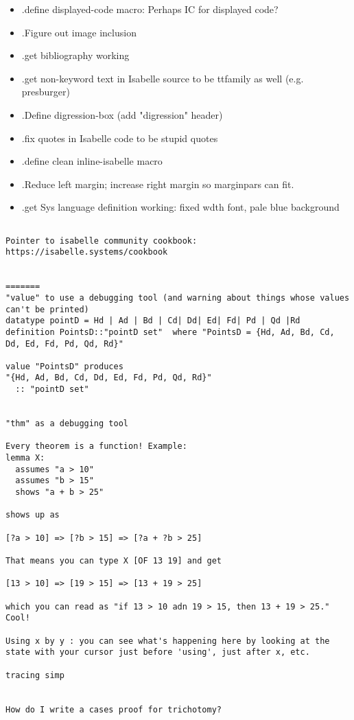 \begin{itemize}
\item .define displayed-code macro: Perhaps IC for displayed code? 
\item .Figure out image inclusion
\item .get bibliography working
\item .get non-keyword text in Isabelle source to be ttfamily as well (e.g. presburger)
\item .Define digression-box (add "digression" header)
\item .fix quotes in Isabelle code to be stupid quotes
\item .define clean inline-isabelle macro 
\item .Reduce left margin; increase right margin so marginpars can fit.
\item .get Sys language definition working: fixed wdth font, pale blue background
\end{itemize}

\begin{verbatim}

Pointer to isabelle community cookbook: https://isabelle.systems/cookbook


=======
"value" to use a debugging tool (and warning about things whose values can't be printed)
datatype pointD = Hd | Ad | Bd | Cd| Dd| Ed| Fd| Pd | Qd |Rd
definition PointsD::"pointD set"  where "PointsD = {Hd, Ad, Bd, Cd, Dd, Ed, Fd, Pd, Qd, Rd}"

value "PointsD" produces
"{Hd, Ad, Bd, Cd, Dd, Ed, Fd, Pd, Qd, Rd}"
  :: "pointD set"


"thm" as a debugging tool

Every theorem is a function! Example: 
lemma X: 
  assumes "a > 10"
  assumes "b > 15"
  shows "a + b > 25"
  
shows up as 

[?a > 10] => [?b > 15] => [?a + ?b > 25]

That means you can type X [OF 13 19] and get

[13 > 10] => [19 > 15] => [13 + 19 > 25]

which you can read as "if 13 > 10 adn 19 > 15, then 13 + 19 > 25." Cool!

Using x by y : you can see what's happening here by looking at the state with your cursor just before 'using', just after x, etc. 

tracing simp


How do I write a cases proof for trichotomy? 

\end{verbatim}


